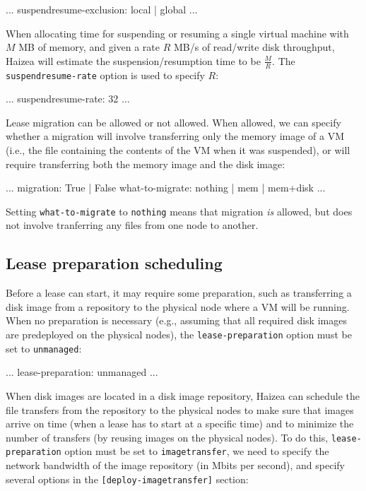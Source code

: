 \begin{wideshellverbatim}
[scheduling]
...
suspendresume-exclusion: local | global
...
\end{wideshellverbatim}

When allocating time for suspending or resuming a single virtual machine with $M$ MB of memory, and given a rate $R$ MB/s of read/write disk throughput, Haizea will estimate the suspension/resumption time to be $\frac{M}{R}$. The \texttt{suspendresume-rate} option is used to specify $R$:

\begin{wideshellverbatim}
[simulation]
...
suspendresume-rate: 32
...
\end{wideshellverbatim}

Lease migration can be allowed or not allowed. When allowed, we can specify whether a migration will involve transferring only the memory image of a VM (i.e., the file containing the contents of the VM when it was suspended), or will require transferring both the memory image and the disk image:

\begin{wideshellverbatim}
[scheduling]
...
migration: True | False
what-to-migrate: nothing | mem | mem+disk
...
\end{wideshellverbatim}

Setting \texttt{what-to-migrate} to \texttt{nothing} means that migration \emph{is} allowed, but does not involve tranferring any files from one node to another.


\subsection{Lease preparation scheduling}

Before a lease can start, it may require some preparation, such as transferring a disk image from a repository to the physical node where a VM will be running. When no preparation is necessary (e.g., assuming that all required disk images are predeployed on the physical nodes), the \texttt{lease-preparation} option must be set to \texttt{unmanaged}:

\begin{wideshellverbatim}
[general]
...
lease-preparation: unmanaged
...
\end{wideshellverbatim}

When disk images are located in a disk image repository, Haizea can schedule the file transfers from the repository to the physical nodes to make sure that images arrive on time (when a lease has to start at a specific time) and to minimize the number of transfers (by reusing images on the physical nodes). To do this, \texttt{lease-preparation} option must be set to \texttt{imagetransfer}, we need to specify the network bandwidth of the image repository (in Mbits per second), and specify several options in the \texttt{[deploy-imagetransfer]} section:

